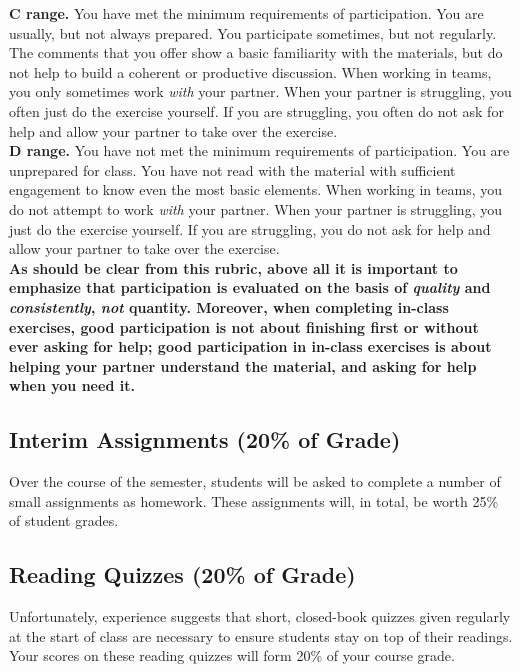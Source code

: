 \documentclass[12pt]{article}
\begin{document}
\textbf{C range.}  You have met the minimum requirements of participation.  You are usually, but not always prepared.  You participate sometimes, but not regularly.  The comments that you offer show a basic familiarity with the materials, but do not help to build a coherent or productive discussion.  When working in teams, you only sometimes work \emph{with} your partner. When your partner is struggling, you often just do the exercise yourself. If you are struggling, you often do not ask for help and allow your partner to take over the exercise. \\

\textbf{D range.}  You have not met the minimum requirements of participation.  You are unprepared for class.  You have not read with the material with sufficient engagement to know even the most basic elements.  When working in teams, you do not attempt to work \emph{with} your partner. When your partner is struggling, you just do the exercise yourself. If you are struggling, you do not ask for help and allow your partner to take over the exercise.\\

\textbf{As should be clear from this rubric, above all it is important to emphasize that participation is evaluated on the basis of \emph{quality} and \emph{consistently}, \emph{not} quantity. Moreover, when completing in-class exercises, good participation is not about finishing first or without ever asking for help; good participation in in-class exercises is about helping your partner understand the material, and asking for help when you need it.}

\subsection{Interim Assignments (20\% of Grade)}

Over the course of the semester, students will be asked to complete a number of small assignments as homework. These assignments will, in total, be worth 25\% of student grades.

\subsection{Reading Quizzes (20\% of Grade)}

Unfortunately, experience suggests that short, closed-book quizzes given regularly at the start of class are necessary to ensure students stay on top of their readings. Your scores on these reading quizzes will form 20\% of your course grade.
\end{document}
